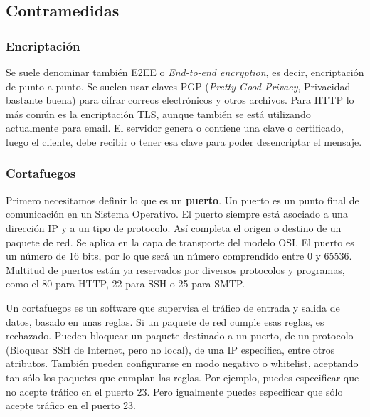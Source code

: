 \documentclass[a4paper, 11pt]{report} %
\begin{document}
\subsection{Contramedidas}
\subsubsection{Encriptación}
Se suele denominar también E2EE o \textit{End-to-end encryption}, es decir, encriptación de punto a punto. Se suelen usar claves PGP (\textit{Pretty Good Privacy}, Privacidad bastante buena) para cifrar correos electrónicos y otros archivos. Para HTTP lo más común es la encriptación TLS, aunque también se está utilizando actualmente para email. El servidor genera o contiene una clave o certificado, luego el cliente, debe recibir o tener esa clave para poder desencriptar el mensaje.
\subsubsection{Cortafuegos}
Primero necesitamos definir lo que es un \textbf{puerto}. Un puerto es un punto final de comunicación en un Sistema Operativo. El puerto siempre está asociado a una dirección IP y a un tipo de protocolo. Así completa el origen o destino de un paquete de red. Se aplica en la capa de transporte del modelo OSI. El puerto es un número de 16 bits, por lo que será un número comprendido entre 0 y 65536. Multitud de puertos están ya reservados por diversos protocolos y programas, como el 80 para HTTP, 22 para SSH o 25 para SMTP.

Un cortafuegos es un software que supervisa el tráfico de entrada y salida de datos, basado en unas reglas. Si un paquete de red cumple esas reglas, es rechazado. Pueden bloquear un paquete destinado a un puerto, de un protocolo (Bloquear SSH de Internet, pero no local), de una IP específica, entre otros atributos. También pueden configurarse en modo negativo o whitelist, aceptando tan sólo los paquetes que cumplan las reglas. Por ejemplo, puedes especificar que no acepte tráfico en el puerto 23. Pero igualmente puedes especificar que sólo acepte tráfico en el puerto 23.
\end{document}
